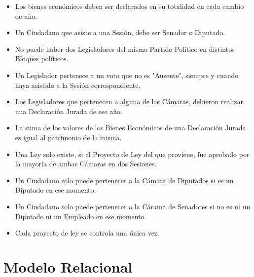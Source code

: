 \begin{itemize}
	\item Los bienes económicos deben ser declarados en su totalidad en cada cambio de año.
	\item Un Ciudadano que asiste a una Sesión, debe ser Senador o Diputado. 
	\item No puede haber dos Legisladores del mismo Partido Político en distintos Bloques políticos. 
	\item Un Legislador pertenece a un voto que no es "Ausente", siempre y cuando haya asistido a la Sesión correspondiente.
	\item Los Legisladores que pertenecen a alguna de las Cámaras, debieron realizar una Declaración Jurada de ese año.
	\item La suma de los valores de los Bienes Económicos de una Declaración Jurada es igual al patrimonio de la misma. 
	\item Una Ley solo existe, si el Proyecto de Ley del que proviene, fue aprobado por la mayoría de ambas Cámaras en dos Sesiones. 
	\item Un Ciudadano solo puede pertenecer a la Cámara de Diputados si es un Diputado en ese momento.
	\item Un Ciudadano solo puede pertenecer a la Cárama de Senadores si no es ni un Diputado ni un Empleado en ese momento. 
	\item Cada proyecto de ley se controla una única vez.
	
\end{itemize}

\newpage

\section{Modelo Relacional}

